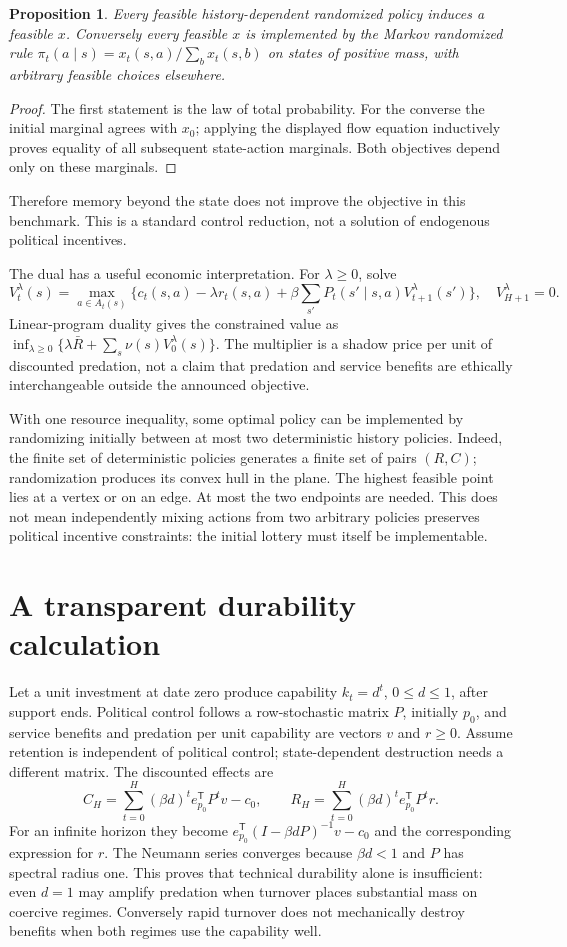 \documentclass[11pt]{article}
\newtheorem{proposition}{Proposition}
\begin{document}
\begin{proposition}
Every feasible history-dependent randomized policy induces a feasible $x$. Conversely every feasible $x$ is implemented by the Markov randomized rule
$\pi_t(a\mid s)=x_t(s,a)/\sum_bx_t(s,b)$ on states of positive mass, with arbitrary feasible choices elsewhere.
\end{proposition}
\begin{proof}
The first statement is the law of total probability. For the converse the initial marginal agrees with $x_0$; applying the displayed flow equation inductively proves equality of all subsequent state-action marginals. Both objectives depend only on these marginals.
\end{proof}
Therefore memory beyond the state does not improve the objective in this benchmark. This is a standard control reduction, not a solution of endogenous political incentives.

The dual has a useful economic interpretation. For $\lambda\geq0$, solve
\[
 V_t^\lambda(s)=\max_{a\in A_t(s)}\{c_t(s,a)-\lambda r_t(s,a)
       +\beta\sum_{s'}P_t(s'\mid s,a)V_{t+1}^\lambda(s')\},
 \quad V_{H+1}^\lambda=0.
\]
Linear-program duality gives the constrained value as
$\inf_{\lambda\geq0}\{\lambda\bar R+\sum_s\nu(s)V_0^\lambda(s)\}$.
The multiplier is a shadow price per unit of discounted predation, not a claim that predation and service benefits are ethically interchangeable outside the announced objective.

With one resource inequality, some optimal policy can be implemented by randomizing initially between at most two deterministic history policies. Indeed, the finite set of deterministic policies generates a finite set of pairs $(R,C)$; randomization produces its convex hull in the plane. The highest feasible point lies at a vertex or on an edge. At most the two endpoints are needed. This does not mean independently mixing actions from two arbitrary policies preserves political incentive constraints: the initial lottery must itself be implementable.

\section{A transparent durability calculation}
Let a unit investment at date zero produce capability $k_t=d^t$, $0\leq d\leq1$, after support ends. Political control follows a row-stochastic matrix $P$, initially $p_0$, and service benefits and predation per unit capability are vectors $v$ and $r\geq0$. Assume retention is independent of political control; state-dependent destruction needs a different matrix. The discounted effects are
\[
 C_H=\sum_{t=0}^H(\beta d)^t e_{p_0}^{\mathsf T}P^tv-c_0,
 \qquad R_H=\sum_{t=0}^H(\beta d)^t e_{p_0}^{\mathsf T}P^tr.
\]
For an infinite horizon they become $e_{p_0}^{\mathsf T}(I-\beta dP)^{-1}v-c_0$ and the corresponding expression for $r$. The Neumann series converges because $\beta d<1$ and $P$ has spectral radius one. This proves that technical durability alone is insufficient: even $d=1$ may amplify predation when turnover places substantial mass on coercive regimes. Conversely rapid turnover does not mechanically destroy benefits when both regimes use the capability well.
\end{document}
